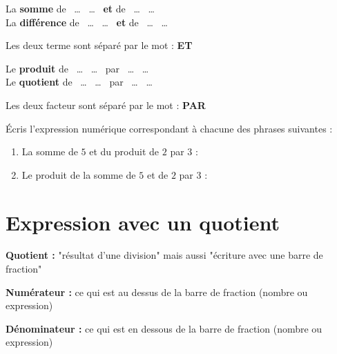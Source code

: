 \documentclass[a4paper,10pt]{report}
\begin{document}
\begin{defn}

\begin{minipage}{7cm}
La \textbf{somme} de ~\dots~ \dots~ \textbf{et} de ~\dots~ \dots~  \\      
La \textbf{différence} de ~\dots~ \dots~  \textbf{et} de ~\dots~ \dots~ 
\end{minipage}
\begin{minipage}{7cm}
Les deux terme sont séparé par le mot : \textbf{ET}
\end{minipage}           

\vspace{3mm}
\noindent \begin{minipage}{7cm}
Le \textbf{produit} de ~\dots~ \dots~ par ~\dots~ \dots~\\
Le \textbf{quotient} de ~\dots~ \dots~ par ~\dots~ \dots~
\end{minipage}
\begin{minipage}{7cm}
Les deux facteur sont séparé par le mot : \textbf{PAR}  
\end{minipage}

\end{defn}

\begin{ex}
Écris l'expression numérique correspondant à chacune des phrases suivantes :

\begin{enumerate}
\item La somme de $5$ et du produit de $2$ par $3$ : 

\noindent\grandscarreaux{\linewidth}{1.6cm}
\item Le produit de la somme de $5$ et de $2$ par $3$ :

\noindent\grandscarreaux{\linewidth}{1.6cm}
\end{enumerate}
\end{ex}

\section{Expression avec un quotient}

\begin{defn}
\textbf{Quotient : }"résultat d'une division" mais aussi "écriture avec une barre de fraction"

\textbf{Numérateur : }ce qui est au dessus de la barre de fraction (nombre ou expression)

\textbf{Dénominateur : }ce qui est en dessous de la barre de fraction (nombre ou expression)
\end{defn}
\end{document}
